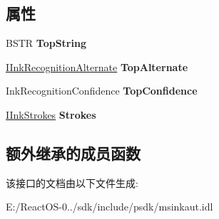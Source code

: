 \subsection*{属性}
\begin{DoxyCompactItemize}
\item 
\mbox{\label{interface_m_s_i_n_k_a_u_t_lib_1_1_i_ink_recognition_result_a11dcf59b07dac9e10382fa27ba390b48}} 
B\+S\+TR {\bfseries Top\+String}
\item 
\mbox{\label{interface_m_s_i_n_k_a_u_t_lib_1_1_i_ink_recognition_result_ac637779b1005eff2d657b701e5a186db}} 
\hyperlink{interface_m_s_i_n_k_a_u_t_lib_1_1_i_ink_recognition_alternate}{I\+Ink\+Recognition\+Alternate} {\bfseries Top\+Alternate}
\item 
\mbox{\label{interface_m_s_i_n_k_a_u_t_lib_1_1_i_ink_recognition_result_a01e014828ed457641a5956b57922682c}} 
Ink\+Recognition\+Confidence {\bfseries Top\+Confidence}
\item 
\mbox{\label{interface_m_s_i_n_k_a_u_t_lib_1_1_i_ink_recognition_result_ae9ca47c7ab70c87e61ecf0ddeb9371c7}} 
\hyperlink{interface_m_s_i_n_k_a_u_t_lib_1_1_i_ink_strokes}{I\+Ink\+Strokes} {\bfseries Strokes}
\end{DoxyCompactItemize}
\subsection*{额外继承的成员函数}


该接口的文档由以下文件生成\+:\begin{DoxyCompactItemize}
\item 
E\+:/\+React\+O\+S-\/0../sdk/include/psdk/msinkaut.\+idl\end{DoxyCompactItemize}
